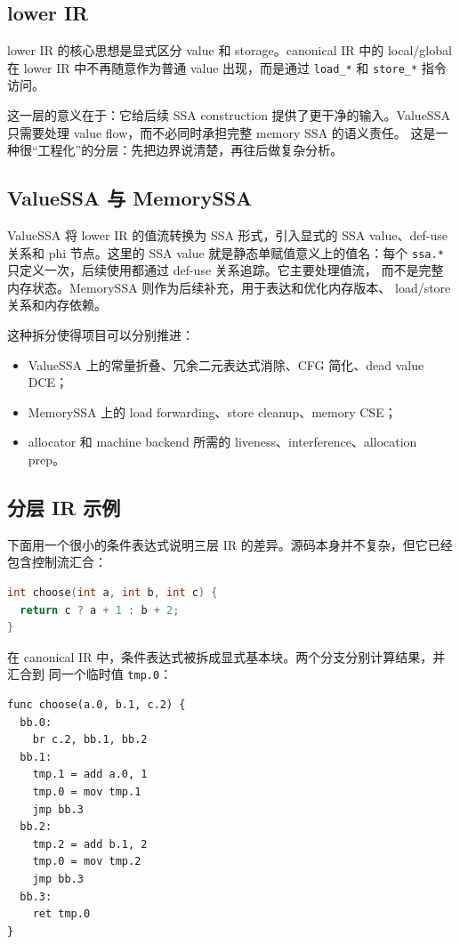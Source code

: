 \documentclass[UTF8,a4paper,11pt]{ctexart}
\begin{document}
\subsection{lower IR}

lower IR 的核心思想是显式区分 value 和 storage。canonical IR 中的 local/global
在 lower IR 中不再随意作为普通 value 出现，而是通过 \texttt{load\_*} 和
\texttt{store\_*} 指令访问。

这一层的意义在于：它给后续 SSA construction 提供了更干净的输入。ValueSSA
只需要处理 value flow，而不必同时承担完整 memory SSA 的语义责任。
这是一种很“工程化”的分层：先把边界说清楚，再往后做复杂分析。

\subsection{ValueSSA 与 MemorySSA}

ValueSSA 将 lower IR 的值流转换为 SSA 形式，引入显式的 SSA value、def-use
关系和 phi 节点。这里的 SSA value 就是静态单赋值意义上的值名：每个
\texttt{ssa.*} 只定义一次，后续使用都通过 def-use 关系追踪。它主要处理值流，
而不是完整内存状态。MemorySSA 则作为后续补充，用于表达和优化内存版本、
load/store 关系和内存依赖。

这种拆分使得项目可以分别推进：

\begin{itemize}
  \item ValueSSA 上的常量折叠、冗余二元表达式消除、CFG 简化、dead value DCE；
  \item MemorySSA 上的 load forwarding、store cleanup、memory CSE；
  \item allocator 和 machine backend 所需的 liveness、interference、allocation prep。
\end{itemize}

\subsection{分层 IR 示例}

下面用一个很小的条件表达式说明三层 IR 的差异。源码本身并不复杂，但它已经
包含控制流汇合：

\begin{lstlisting}[language=C]
int choose(int a, int b, int c) {
  return c ? a + 1 : b + 2;
}
\end{lstlisting}

在 canonical IR 中，条件表达式被拆成显式基本块。两个分支分别计算结果，并汇合到
同一个临时值 \texttt{tmp.0}：

\begin{lstlisting}[language={}]
func choose(a.0, b.1, c.2) {
  bb.0:
    br c.2, bb.1, bb.2
  bb.1:
    tmp.1 = add a.0, 1
    tmp.0 = mov tmp.1
    jmp bb.3
  bb.2:
    tmp.2 = add b.1, 2
    tmp.0 = mov tmp.2
    jmp bb.3
  bb.3:
    ret tmp.0
}
\end{lstlisting}
\end{document}
